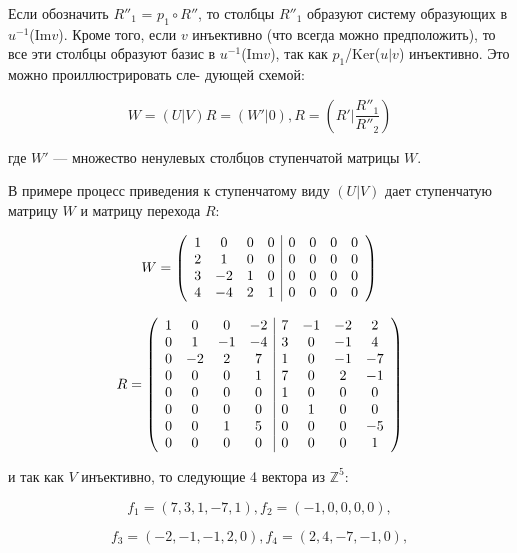 {Если обозначить $R''_1$ = $p_1 \circ R''$, то столбцы $R''_{1}$ образуют систему
образующих в $u^{-1}$(Im{$v$}). Кроме того, если $v$ инъективно (что всегда
можно предположить), то все эти столбцы образуют базис в $u^{-1}$(Im{$v$}),
так как $p_{1}$/Ker($u | v$) инъективно. Это можно проиллюстрировать сле-
дующей схемой:

\begin{equation*}
W = (U | V)R = (W' | 0), R = \left(R' | \frac{R''_{1}}{R''_{2}} \right)
\end{equation*}

где $W'$ — множество ненулевых столбцов ступенчатой матрицы $W$.

В примере процесс приведения к ступенчатому виду $(U | V)$ дает
ступенчатую матрицу $W$ и матрицу перехода $R$:

\[ W = {\left( \begin{array}{cccccccc}
1 & 0 & 0 & 0 & \multicolumn{1}{|c}{0} & 0 & 0 & 0 \\
2 & 1 & 0 & 0 & \multicolumn{1}{|c}{0} & 0 & 0 & 0 \\
3 & -2 & 1 & 0 & \multicolumn{1}{|c}{0} & 0 & 0 & 0 \\
4 & -4 & 2 & 1 & \multicolumn{1}{|c}{0} & 0 & 0 & 0
\end{array} \right)} \]

\[ R = {\left( \begin{array}{cccccccc}
1 & 0 & 0 & -2 & \multicolumn{1}{|c}{7} & -1 & -2 & 2 \\
0 & 1 & -1 & -4 & \multicolumn{1}{|c}{3} & 0 & -1 & 4 \\
0 & -2 & 2 & 7 & \multicolumn{1}{|c}{1} & 0 & -1 & -7 \\
0 & 0 & 0 & 1 & \multicolumn{1}{|c}{7} & 0 & 2 & -1 \\
0 & 0 & 0 & 0 & \multicolumn{1}{|c}{1} & 0 & 0 & 0 \\
0 & 0 & 0 & 0 & \multicolumn{1}{|c}{0} & 1 & 0 & 0 \\
0 & 0 & 1 & 5 & \multicolumn{1}{|c}{0} & 0 & 0 & -5 \\
0 & 0 & 0 & 0 & \multicolumn{1}{|c}{0} & 0 & 0 & 1
\end{array} \right)} \]

\noindent и так как $V$ инъективно, то следующие 4 вектора из $\mathbb {Z}^{5}$:

\begin{equation*}
f_1 = (7,3,1,-7,1), f_2 = (-1,0,0,0,0),
\end{equation*}

\begin{equation*}
f_3 = (-2,-1,-1,2,0), f_4 = (2,4,-7,-1,0),
\end{equation*}

}
